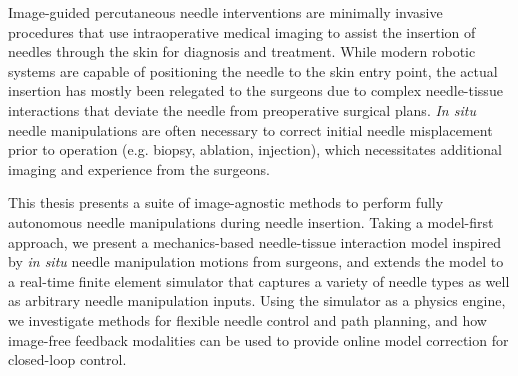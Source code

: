 


Image-guided percutaneous needle interventions are minimally invasive procedures that use intraoperative medical imaging to assist the insertion of needles through the skin for diagnosis and treatment. While modern robotic systems are capable of positioning the needle to the skin entry point, the actual insertion has mostly been relegated to the surgeons due to complex needle-tissue interactions that deviate the needle from preoperative surgical plans. \textit{In situ} needle manipulations are often necessary to correct initial needle misplacement prior to operation (e.g. biopsy, ablation, injection), which necessitates additional imaging and experience from the surgeons.

This thesis presents a suite of image-agnostic methods to perform fully autonomous needle manipulations during needle insertion. Taking a model-first approach, we present a mechanics-based needle-tissue interaction model inspired by \textit{in situ} needle manipulation motions from surgeons, and extends the model to a real-time finite element simulator that captures a variety of needle types as well as arbitrary needle manipulation inputs. Using the simulator as a physics engine, we investigate methods for flexible needle control and path planning, and how image-free feedback modalities can be used to provide online model correction for closed-loop control.



